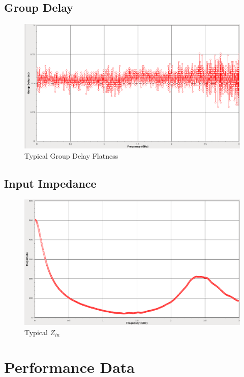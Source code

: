 \documentclass[11pt]{article}
\begin{document}
\subsection{Group Delay}

\begin{figure}[h]
\centering
\includegraphics[width=14cm]{typical-groupdelay.png}
\caption{Typical Group Delay Flatness}
\label{typical-groupdelay}
\end{figure}
\FloatBarrier

\subsection{Input Impedance}

\begin{figure}[h!]
\centering
\includegraphics[width=14cm]{typical-zin.png}
\caption{Typical $Z_{in}$}
\label{typical-zin}
\end{figure}

\FloatBarrier

\pagebreak
\section{Performance Data}
\end{document}
